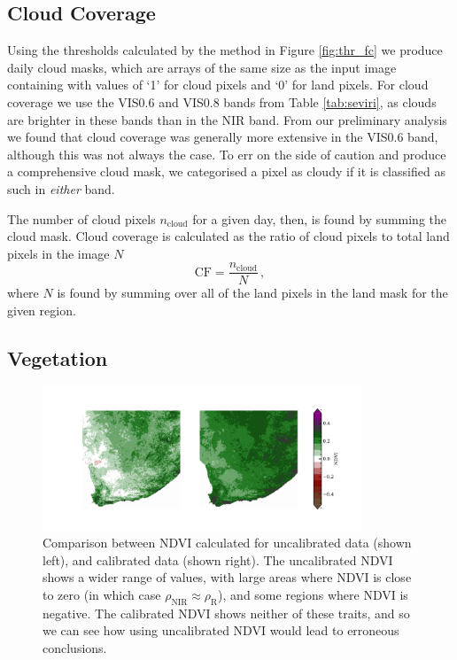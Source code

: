 \subsection{Cloud Coverage}
Using the thresholds calculated by the method in Figure \ref{fig:thr_fc} we
produce daily cloud masks, which are arrays of the same size as the input image
containing with values of `1' for cloud pixels and `0' for land pixels. For
cloud coverage we use the VIS0.6 and VIS0.8 bands from Table \ref{tab:seviri},
as clouds are brighter in these bands than in the NIR band. From our preliminary
analysis we found that cloud coverage was generally more extensive in the VIS0.6
band, although this was not always the case. To err on the side of caution and
produce a comprehensive cloud mask, we categorised a pixel as cloudy if it is
classified as such in \emph{either} band.

The number of cloud pixels $n_{\mathrm{cloud}}$ for a given day, then, is found
by summing the cloud mask. Cloud coverage is calculated as the ratio of cloud
pixels to total land pixels in the image $N$
\begin{equation}
  \mathrm{CF} = \frac{n_{\mathrm{cloud}}}{N} \,,
  \label{eq:cloud_frac}
\end{equation}
where $N$ is found by summing over all of the land pixels in the land mask for
the given region.

\subsection{Vegetation}

\begin{figure}
  \centering
  \includegraphics[width=0.85\textwidth]{figures/ndvi_calibration_comparison.pdf}
  \caption{Comparison between NDVI calculated for uncalibrated data (shown left),
    and calibrated data (shown right). The uncalibrated NDVI shows a wider range
    of values, with large areas where NDVI is close to zero (in which case
    $\rho_{\textrm{NIR}}\approx\rho_{\textrm{R}}$), and some regions where NDVI is
    negative. The calibrated NDVI shows neither of these traits, and so we can
    see how using uncalibrated NDVI would lead to erroneous conclusions.}
  \label{fig:calibrationcomp}
\end{figure}

